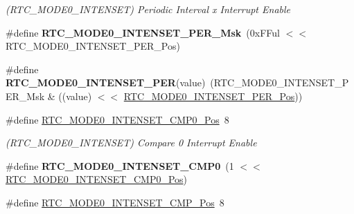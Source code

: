 \begin{DoxyCompactItemize}
\begin{DoxyCompactList}\small\item\em (R\+T\+C\+\_\+\+M\+O\+D\+E0\+\_\+\+I\+N\+T\+E\+N\+S\+E\+T) Periodic Interval x Interrupt Enable \end{DoxyCompactList}\item 
\hypertarget{group___s_a_m_l21___r_t_c_gabb9249de194f81ab8742143d16916f91}{}\#define {\bfseries R\+T\+C\+\_\+\+M\+O\+D\+E0\+\_\+\+I\+N\+T\+E\+N\+S\+E\+T\+\_\+\+P\+E\+R\+\_\+\+Msk}~(0x\+F\+Ful $<$$<$ R\+T\+C\+\_\+\+M\+O\+D\+E0\+\_\+\+I\+N\+T\+E\+N\+S\+E\+T\+\_\+\+P\+E\+R\+\_\+\+Pos)\label{group___s_a_m_l21___r_t_c_gabb9249de194f81ab8742143d16916f91}

\item 
\hypertarget{group___s_a_m_l21___r_t_c_ga7ee7bc9e7aa97741482dbaf6316eec67}{}\#define {\bfseries R\+T\+C\+\_\+\+M\+O\+D\+E0\+\_\+\+I\+N\+T\+E\+N\+S\+E\+T\+\_\+\+P\+E\+R}(value)~(R\+T\+C\+\_\+\+M\+O\+D\+E0\+\_\+\+I\+N\+T\+E\+N\+S\+E\+T\+\_\+\+P\+E\+R\+\_\+\+Msk \& ((value) $<$$<$ \hyperlink{group___s_a_m_l21___r_t_c_ga0beab8f00a957ca0996fc7ed055421b4}{R\+T\+C\+\_\+\+M\+O\+D\+E0\+\_\+\+I\+N\+T\+E\+N\+S\+E\+T\+\_\+\+P\+E\+R\+\_\+\+Pos}))\label{group___s_a_m_l21___r_t_c_ga7ee7bc9e7aa97741482dbaf6316eec67}

\item 
\hypertarget{group___s_a_m_l21___r_t_c_ga00b70aff1636314843a9f4d3e8d1c27f}{}\#define \hyperlink{group___s_a_m_l21___r_t_c_ga00b70aff1636314843a9f4d3e8d1c27f}{R\+T\+C\+\_\+\+M\+O\+D\+E0\+\_\+\+I\+N\+T\+E\+N\+S\+E\+T\+\_\+\+C\+M\+P0\+\_\+\+Pos}~8\label{group___s_a_m_l21___r_t_c_ga00b70aff1636314843a9f4d3e8d1c27f}

\begin{DoxyCompactList}\small\item\em (R\+T\+C\+\_\+\+M\+O\+D\+E0\+\_\+\+I\+N\+T\+E\+N\+S\+E\+T) Compare 0 Interrupt Enable \end{DoxyCompactList}\item 
\hypertarget{group___s_a_m_l21___r_t_c_ga0067531668edb6910c70cd57eea04765}{}\#define {\bfseries R\+T\+C\+\_\+\+M\+O\+D\+E0\+\_\+\+I\+N\+T\+E\+N\+S\+E\+T\+\_\+\+C\+M\+P0}~(1 $<$$<$ \hyperlink{group___s_a_m_l21___r_t_c_ga00b70aff1636314843a9f4d3e8d1c27f}{R\+T\+C\+\_\+\+M\+O\+D\+E0\+\_\+\+I\+N\+T\+E\+N\+S\+E\+T\+\_\+\+C\+M\+P0\+\_\+\+Pos})\label{group___s_a_m_l21___r_t_c_ga0067531668edb6910c70cd57eea04765}

\item 
\hypertarget{group___s_a_m_l21___r_t_c_gaac99a4ba6781229ea22960ac65244ace}{}\#define \hyperlink{group___s_a_m_l21___r_t_c_gaac99a4ba6781229ea22960ac65244ace}{R\+T\+C\+\_\+\+M\+O\+D\+E0\+\_\+\+I\+N\+T\+E\+N\+S\+E\+T\+\_\+\+C\+M\+P\+\_\+\+Pos}~8\label{group___s_a_m_l21___r_t_c_gaac99a4ba6781229ea22960ac65244ace}


\end{DoxyCompactItemize}
